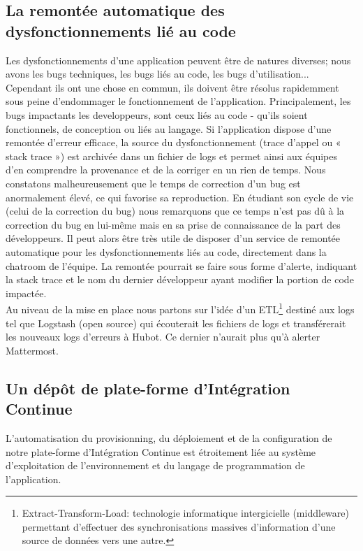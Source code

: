       \subsection{La remontée automatique des dysfonctionnements lié au code}
      Les dysfonctionnements d'une application peuvent être de natures diverses; nous avons les bugs techniques, les bugs liés au code, les bugs d'utilisation... Cependant ils ont une chose en commun, ils doivent être résolus rapidemment sous peine d'endommager le fonctionnement de l'application. Principalement, les bugs impactants les developpeurs, sont ceux liés au code - qu'ils soient fonctionnels, de conception ou liés au langage. Si l'application dispose d'une remontée d'erreur efficace, la source du dysfonctionnement (trace d'appel ou « stack trace ») est archivée dans un fichier de logs et permet ainsi aux équipes d'en comprendre la provenance et de la corriger en un rien de temps. Nous constatons malheureusement que le temps de correction d'un bug est anormalement élevé, ce qui favorise sa reproduction. En étudiant son cycle de vie (celui de la correction du bug) nous remarquons que ce temps n'est pas dû à la correction du bug en lui-même mais en sa prise de connaissance de la part des développeurs. Il peut alors être très utile de disposer d'un service de remontée automatique pour les dysfonctionnements liés au code, directement dans la chatroom de l'équipe. La remontée pourrait se faire sous forme d'alerte, indiquant la stack trace et le nom du dernier développeur ayant modifier la portion de code impactée.\\

      Au niveau de la mise en place nous partons sur l'idée d'un ETL\footnote{Extract-Transform-Load: technologie informatique intergicielle (middleware) permettant d'effectuer des synchronisations massives d'information d'une source de données vers une autre.} destiné aux logs tel que Logstash (open source) qui écouterait les fichiers de logs et transférerait les nouveaux logs d'erreurs à Hubot. Ce dernier n'aurait plus qu'à alerter Mattermost.

      \subsection{Un dépôt de plate-forme d'Intégration Continue}
      L'automatisation du provisionning, du déploiement et de la configuration de notre plate-forme d'Intégration Continue est étroitement liée au système d'exploitation de l'environnement et du langage de programmation de l'application.

